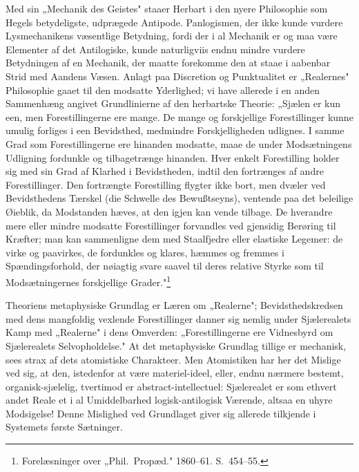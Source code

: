 \documentclass[12pt]{book}
\newcommand{\opage}[1]{\marginnote{\footnotesize\textit{[#1]}}}
\begin{document}
Med sin „Mechanik des Geistes" staaer Herbart i den nyere Philosophie som Hegels betydeligste,
udprægede Antipode. Panlogismen, der ikke kunde vurdere Lysmechanikens væsentlige Betydning, fordi
der i al Mechanik er og maa være Elementer af det Antilogiske, kunde naturligviis endnu mindre
vurdere Betydningen af en Mechanik, der maatte forekomme den at staae i aabenbar Strid med Aandens
Væsen. Anlagt paa Discretion og Punktualitet er „Realernes" Philosophie gaaet til den modsatte
Yderlighed; vi have allerede i en anden Sammenhæng angivet Grundlinierne af den herbartske Theorie:
„Sjælen er kun een, men Forestillingerne
\opage{417} ere mange. De mange og forskjellige Forestillinger kunne umulig forliges i een Bevidsthed, medmindre
Forskjelligheden udlignes. I samme Grad som Forestillingerne ere hinanden modsatte, maae de under
Modsætningens Udligning fordunkle og tilbagetrænge hinanden. Hver enkelt Forestilling holder sig med
sin Grad af Klarhed i Bevidstheden, indtil den fortrænges af andre Forestillinger. Den fortrængte
Forestilling flygter ikke bort, men dvæler ved Bevidsthedens Tærskel (die Schwelle des Bewußtseyns),
ventende paa det beleilige Øieblik, da Modstanden hæves, at den igjen kan vende tilbage. De hverandre
mere eller mindre modsatte Forestillinger forvandles ved gjensidig Berøring til Kræfter; man kan
sammenligne dem med Staalfjedre eller elastiske Legemer: de virke og paavirkes, de fordunkles og
klares, hæmmes og fremmes i Spændingsforhold, der nøiagtig svare saavel til deres relative Styrke som
til Modsætningernes forskjellige Grader."\footnote{Forelæsninger over „Phil.\ Propæd." 1860--61.
S.~454--55.}

Theoriens metaphysiske Grundlag er Læren om „Realerne"; Bevidsthedskredsen med dens mangfoldig
vexlende Forestillinger danner sig nemlig under Sjælerealets Kamp med „Realerne" i dens Omverden:
„Forestillingerne ere Vidnesbyrd om Sjælerealets Selvopholdelse." At det metaphysiske Grundlag
tillige er mechanisk, sees strax af dets atomistiske Charakteer. Men Atomistiken har her det Mislige
ved sig, at den, istedenfor at være materiel-ideel, eller, endnu nærmere bestemt, organisk-sjælelig,
tvertimod er abstract-intellectuel: Sjælerealet er som ethvert andet Reale et i al Umiddelbarhed
logisk-antilogisk Værende, altsaa en uhyre Modsigelse! Denne Mislighed ved Grundlaget giver sig
allerede tilkjende i Systemets første Sætninger.
\end{document}
